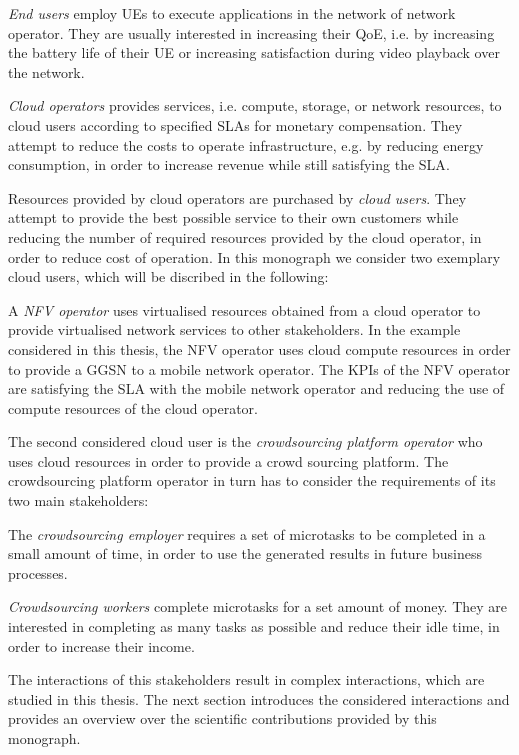 \emph{End users} employ \glspl{UE} to execute applications in the network of network operator. 
They are usually interested in increasing their \gls{QoE}, i.e. by increasing the battery life of their \gls{UE} or increasing satisfaction during video playback over the network.

\emph{Cloud operators} provides services, i.e. compute, storage, or network resources, to cloud users according to specified \glspl{SLA} for monetary compensation. 
They attempt to reduce the costs to operate infrastructure, e.g. by reducing energy consumption, in order to increase revenue while still satisfying the \gls{SLA}.

Resources provided by cloud operators are purchased by \emph{cloud users}.
They attempt to provide the best possible service to their own customers while reducing the number of required resources provided by the cloud operator, in order to reduce cost of operation. In this monograph we consider two exemplary cloud users, which will be discribed in the following:

A \emph{\gls{NFV} operator} uses virtualised resources obtained from a cloud operator to provide virtualised network services to other stakeholders.
In the example considered in this thesis, the \gls{NFV} operator uses cloud compute resources in order to provide a \gls{GGSN} to a mobile network operator.
The \glspl{KPI} of the \gls{NFV} operator are satisfying the \gls{SLA} with the mobile network operator and reducing the use of compute resources of the cloud operator.

The second considered cloud user is the \emph{crowdsourcing platform operator} who uses cloud resources in order to provide a crowd sourcing platform.
The crowdsourcing platform operator in turn has to consider the requirements of its two main stakeholders:

The \emph{crowdsourcing employer} requires a set of microtasks to be completed in a small amount of time, in order to use the generated results in future business processes.

\emph{Crowdsourcing workers} complete microtasks for a set amount of money.
They are interested in completing as many tasks as possible and reduce their idle time, in order to increase their income.

The interactions of this stakeholders result in complex interactions, which are studied in this thesis.
The next section introduces the considered interactions and provides an overview over the scientific contributions provided by this monograph.


